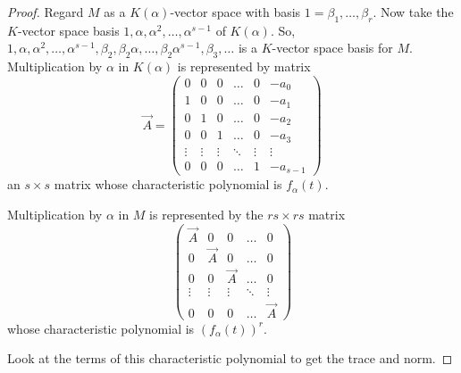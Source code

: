 \documentclass{article}
\begin{document}
\begin{proof}
    Regard $M$ as a $K(\alpha)$-vector space with basis $1 = \beta_1, \dotsc, \beta_r$.
    Now take the $K$-vector space basis $1, \alpha, \alpha^2, \dotsc, \alpha^{s-1}$ of $K(\alpha)$.
    So, $1, \alpha, \alpha^2, \dotsc, \alpha^{s-1}, \beta_2, \beta_2 \alpha, \dotsc, \beta_2 \alpha^{s-1}, \beta_3, \dotsc$ is a $K$-vector space basis for $M$.
    Multiplication by $\alpha$ in $K(\alpha)$ is represented by matrix
    \begin{equation*}
        \vec{A} =
        \begin{pmatrix}
            0      & 0      & 0      & \dots  & 0      & -a_0     \\
            1      & 0      & 0      & \dots  & 0      & -a_1     \\
            0      & 1      & 0      & \dots  & 0      & -a_2     \\
            0      & 0      & 1      & \dots  & 0      & -a_3     \\
            \vdots & \vdots & \vdots & \ddots & \vdots & \vdots   \\
            0      & 0      & 0      & \dots  & 1      & -a_{s-1}
        \end{pmatrix}
    \end{equation*}
    an $s \times s$ matrix whose characteristic polynomial is $f_\alpha(t)$.

    Multiplication by $\alpha$ in $M$ is represented by the $rs \times rs$ matrix
    \begin{equation*}
        \begin{pmatrix}
            \vec{A} & 0       & 0       & \dots  & 0       \\
            0       & \vec{A} & 0       & \dots  & 0       \\
            0       & 0       & \vec{A} & \dots  & 0       \\
            \vdots  & \vdots  & \vdots  & \ddots & \vdots  \\
            0       & 0       & 0       & \dots  & \vec{A}
        \end{pmatrix}
    \end{equation*}
    whose characteristic polynomial is $(f_\alpha(t))^r$.

    Look at the terms of this characteristic polynomial to get the trace and norm.
\end{proof}
\end{document}
